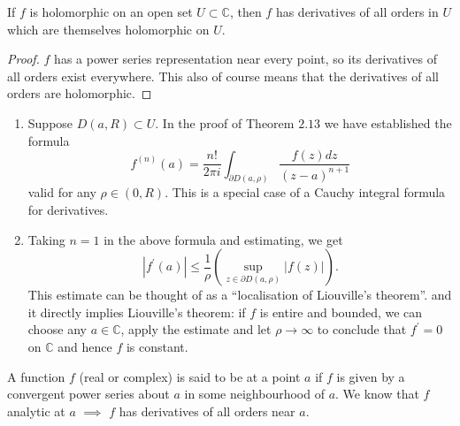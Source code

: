 \documentclass[egregdoesnotlikesansseriftitles,a4paper]{scrartcl}
\begin{document}
\begin{corollary}\label{cor214}
      If $f$ is holomorphic on an open set $U \subset \mathbb{C}$, then $f$ has derivatives of all orders in $U$ which are themselves holomorphic on $U$. 
      \begin{proof}
          $f$ has a power series representation near every point, so its derivatives of all orders exist everywhere. This also of course means that the derivatives of all orders are holomorphic.
    \end{proof}
\end{corollary}
\begin{remarks}
      \begin{enumerate}
           \item Suppose $D(a, R) \subset U$. In the proof of Theorem $2.13$ we have established the formula
           $$
           f^{(n)}(a)=\frac{n !}{2 \pi i} \int_{\partial D(a, \rho)} \frac{f(z) d z}{(z-a)^{n+1}}
           $$
           valid for any $\rho \in(0, R)$. This is a special case of a Cauchy integral formula for derivatives.
           \item Taking $n=1$ in the above formula and estimating, we get \[
               \left|f^{\prime}(a)\right| \leq \frac{1}{\rho}\left(\sup _{z \in \partial D(a, \rho)}|f(z)|\right)
           .\]  This estimate can be thought of as a ``localisation of Liouville's theorem''. and it directly implies Liouville's theorem: if $f$ is entire and bounded, we can choose any $a \in \mathbb{C}$, apply the estimate and let $\rho \rightarrow \infty$ to conclude that $f^{\prime}=0$ on $\mathbb{C}$ and hence $f$ is constant.
      \end{enumerate}
\end{remarks}

A function $f$ (real or complex) is said to be  at a point $a$ if $f$ is given by a convergent power series about $a$ in some neighbourhood of $a$. We know that $f$ analytic at $a$ $\implies $ $f$ has derivatives of all orders near $a$.
\end{document}
